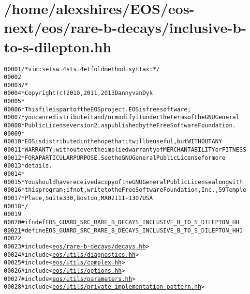 \hypertarget{inclusive-b-to-s-dilepton_8hh_source}{
\section{/home/alexshires/EOS/eos-\/next/eos/rare-\/b-\/decays/inclusive-\/b-\/to-\/s-\/dilepton.hh}
}


\begin{footnotesize}\begin{alltt}
00001 \textcolor{comment}{/* vim: set sw=4 sts=4 et foldmethod=syntax : */}
00002 
00003 \textcolor{comment}{/*}
00004 \textcolor{comment}{ * Copyright (c) 2010, 2011, 2013 Danny van Dyk}
00005 \textcolor{comment}{ *}
00006 \textcolor{comment}{ * This file is part of the EOS project. EOS is free software;}
00007 \textcolor{comment}{ * you can redistribute it and/or modify it under the terms of the GNU General}
00008 \textcolor{comment}{ * Public License version 2, as published by the Free Software Foundation.}
00009 \textcolor{comment}{ *}
00010 \textcolor{comment}{ * EOS is distributed in the hope that it will be useful, but WITHOUT ANY}
00011 \textcolor{comment}{ * WARRANTY; without even the implied warranty of MERCHANTABILITY or FITNESS}
00012 \textcolor{comment}{ * FOR A PARTICULAR PURPOSE.  See the GNU General Public License for more}
00013 \textcolor{comment}{ * details.}
00014 \textcolor{comment}{ *}
00015 \textcolor{comment}{ * You should have received a copy of the GNU General Public License along with}
00016 \textcolor{comment}{ * this program; if not, write to the Free Software Foundation, Inc., 59 Temple}
00017 \textcolor{comment}{ * Place, Suite 330, Boston, MA  02111-1307  USA}
00018 \textcolor{comment}{ */}
00019 
00020 \textcolor{preprocessor}{#ifndef EOS\_GUARD\_SRC\_RARE\_B\_DECAYS\_INCLUSIVE\_B\_TO\_S\_DILEPTON\_HH}
\hypertarget{inclusive-b-to-s-dilepton_8hh_source_l00021}{}\hyperlink{inclusive-b-to-s-dilepton_8hh_a290a6121689c083f2538e84219aea5c1}{00021} \textcolor{preprocessor}{}\textcolor{preprocessor}{#define EOS\_GUARD\_SRC\_RARE\_B\_DECAYS\_INCLUSIVE\_B\_TO\_S\_DILEPTON\_HH 1}
00022 \textcolor{preprocessor}{}
00023 \textcolor{preprocessor}{#include <\hyperlink{decays_8hh}{eos/rare-b-decays/decays.hh}>}
00024 \textcolor{preprocessor}{#include <\hyperlink{diagnostics_8hh}{eos/utils/diagnostics.hh}>}
00025 \textcolor{preprocessor}{#include <\hyperlink{complex_8hh}{eos/utils/complex.hh}>}
00026 \textcolor{preprocessor}{#include <\hyperlink{options_8hh}{eos/utils/options.hh}>}
00027 \textcolor{preprocessor}{#include <\hyperlink{parameters_8hh}{eos/utils/parameters.hh}>}
00028 \textcolor{preprocessor}{#include <\hyperlink{private__implementation__pattern_8hh}{eos/utils/private_implementation_pattern.hh}>}

\end{alltt}
\end{footnotesize}
